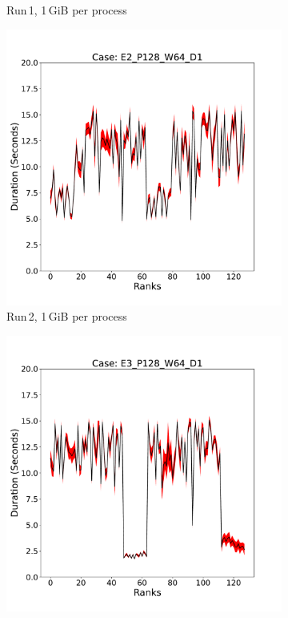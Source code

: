 \begin{figure}[h!]
\begin{subfigure}[b]{0.3\textwidth}
         \caption{Run\,1, 1\,GiB per process}
         \label{fig:E1_1_d2}
     \end{subfigure}
     \hfill
     \begin{subfigure}[b]{0.3\textwidth}
         \centering
         \includegraphics[width=\textwidth, height=\textwidth]{figures/deisa2__E2_P128_W64_D1.pdf}
         \caption{Run\,2, 1\,GiB per process}
         \label{fig:E2_1_d2}
     \end{subfigure}
      \hfill
     \begin{subfigure}[b]{0.3\textwidth}
         \centering
         \includegraphics[width=\textwidth, height=\textwidth]{figures/deisa2__E3_P128_W64_D1.pdf}

\end{subfigure}
\end{figure}
